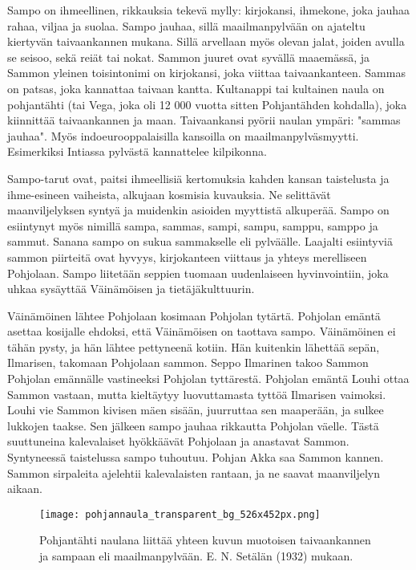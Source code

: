   Sampo on ihmeellinen, rikkauksia tekevä mylly: kirjokansi, ihmekone, joka jauhaa rahaa, viljaa ja
  suolaa. Sampo jauhaa, sillä maailmanpylvään on ajateltu kiertyvän taivaankannen mukana. Sillä
  arvellaan myös olevan jalat, joiden avulla se seisoo, sekä reiät tai nokat. Sammon juuret ovat
  syvällä maaemässä, ja Sammon yleinen toisintonimi on kirjokansi, joka viittaa taivaankanteen.
  Sammas on patsas, joka kannattaa taivaan kantta. Kultanappi tai kultainen naula on pohjantähti
  (tai Vega, joka oli 12 000 vuotta sitten Pohjantähden kohdalla), joka kiinnittää taivaankannen
  ja maan. Taivaankansi pyörii naulan ympäri: "sammas jauhaa". Myös indoeurooppalaisilla kansoilla
  on maailmanpylväsmyytti. Esimerkiksi Intiassa pylvästä kannattelee kilpikonna.
  \par
  Sampo-tarut ovat, paitsi ihmeellisiä kertomuksia kahden kansan taistelusta ja ihme-esineen
  vaiheista, alkujaan kosmisia kuvauksia. Ne selittävät maanviljelyksen syntyä ja muidenkin
  asioiden myyttistä alkuperää. Sampo on esiintynyt myös nimillä sampa, sammas, sampi, sampu,
  samppu, samppo ja sammut. Sanana sampo on sukua sammakselle eli pylväälle. Laajalti esiintyviä
  sammon piirteitä ovat hyvyys, kirjokanteen viittaus ja yhteys merelliseen Pohjolaan. Sampo
  liitetään seppien tuomaan uudenlaiseen hyvinvointiin, joka uhkaa sysäyttää Väinämöisen ja
  tietäjäkulttuurin.
  \par
  Väinämöinen lähtee Pohjolaan kosimaan Pohjolan tytärtä. Pohjolan emäntä a\-settaa kosijalle
  ehdoksi, että Väinämöisen on taottava sampo. Väinämöinen ei tähän pysty, ja hän lähtee pettyneenä
  kotiin. Hän kuitenkin lähettää sepän, Ilmarisen, takomaan Pohjolaan sammon. Seppo Ilmarinen takoo
  Sammon Pohjolan emännälle vastineeksi Pohjolan tyttärestä. Pohjolan emäntä Louhi ottaa Sammon
  vastaan, mutta kieltäytyy luovuttamasta tyttöä Ilmarisen vaimoksi. Louhi vie Sammon kivisen mäen
  sisään, juurruttaa sen maaperään, ja sulkee lukkojen taakse. Sen jälkeen sampo jauhaa rikkautta
  Pohjolan väelle. Tästä suuttuneina kalevalaiset hyökkäävät Pohjolaan ja anastavat Sammon.
  Syntyneessä taistelussa sampo tuhoutuu. Pohjan Akka saa Sammon kannen. Sammon sirpaleita
  ajelehtii kalevalaisten rantaan, ja ne saavat maanviljelyn aikaan.

  \begin{figure}[!hb]%
    \centering%
    \texttt{[image: pohjannaula\_transparent\_bg\_526x452px.png]}%
    \caption{Pohjantähti naulana liittää yhteen kuvun muotoisen taivaankannen ja sampaan eli maailmanpylvään. E. N. Setälän (1932) mukaan.}%
  \end{figure}


